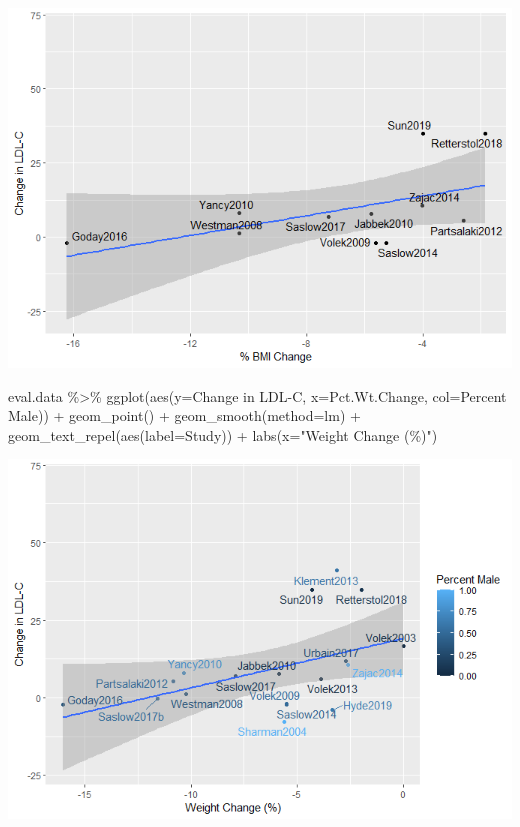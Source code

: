 \documentclass[
]{article}
\newenvironment{Shaded}{\begin{snugshade}}{\end{snugshade}}
\newcommand{\AttributeTok}[1]{\textcolor[rgb]{0.77,0.63,0.00}{#1}}
\newcommand{\FunctionTok}[1]{\textcolor[rgb]{0.00,0.00,0.00}{#1}}
\newcommand{\NormalTok}[1]{#1}
\newcommand{\SpecialCharTok}[1]{\textcolor[rgb]{0.00,0.00,0.00}{#1}}
\newcommand{\StringTok}[1]{\textcolor[rgb]{0.31,0.60,0.02}{#1}}
\begin{document}
\includegraphics{figures/ldl-change-vs-weight-change-3.png}

\begin{Shaded}
\begin{Highlighting}[]
\NormalTok{eval.data }\SpecialCharTok{\%\textgreater{}\%}
  \FunctionTok{ggplot}\NormalTok{(}\FunctionTok{aes}\NormalTok{(}\AttributeTok{y=}\StringTok{\textasciigrave{}}\AttributeTok{Change in LDL{-}C}\StringTok{\textasciigrave{}}\NormalTok{,}
             \AttributeTok{x=}\NormalTok{Pct.Wt.Change,}
             \AttributeTok{col=}\StringTok{\textasciigrave{}}\AttributeTok{Percent Male}\StringTok{\textasciigrave{}}\NormalTok{)) }\SpecialCharTok{+}
  \FunctionTok{geom\_point}\NormalTok{() }\SpecialCharTok{+}
  \FunctionTok{geom\_smooth}\NormalTok{(}\AttributeTok{method=}\StringTok{\textquotesingle{}lm\textquotesingle{}}\NormalTok{) }\SpecialCharTok{+}
  \FunctionTok{geom\_text\_repel}\NormalTok{(}\FunctionTok{aes}\NormalTok{(}\AttributeTok{label=}\NormalTok{Study)) }\SpecialCharTok{+}
  \FunctionTok{labs}\NormalTok{(}\AttributeTok{x=}\StringTok{"Weight Change (\%)"}\NormalTok{)}
\end{Highlighting}
\end{Shaded}

\includegraphics{figures/ldl-change-vs-weight-change-4.png}
\end{document}
